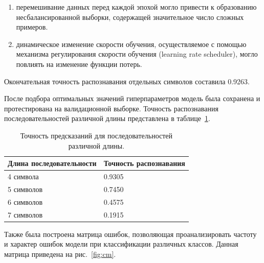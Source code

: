 \begin{enumerate}
    \item перемешивание данных перед каждой эпохой могло привести к образованию 
    несбалансированной выборки, содержащей значительное число сложных примеров.
    \item динамическое изменение скорости обучения, осуществляемое с помощью 
    механизма регулирования скорости обучения (learning rate scheduler), могло 
    повлиять на изменение функции потерь.
\end{enumerate}

Окончательная точность распознавания отдельных символов составила 0.9263.

После подбора оптимальных значений гиперпараметров модель была сохранена и 
протестирована на валидационной выборке. Точность распознавания 
последовательностей различной длины представлена в таблице~\ref{tab:probability}.

\begin{table}[H]
    \centering
    \caption{Точность предсказаний для последовательностей различной длины.}
    \begin{tabular}{|l|l|}
        \hline
        Длина последовательности & Точность распознавания \\
        \hline
        4 символа & 0.9305 \\
        \hline
        5 символов & 0.7450 \\
        \hline
        6 символов & 0.4575 \\
        \hline
        7 символов & 0.1915 \\
        \hline
    \end{tabular}
    \label{tab:probability}
\end{table}

Также была построена матрица ошибок, позволяющая проанализировать частоту и 
характер ошибок модели при классификации различных классов. Данная матрица 
приведена на рис.~\ref{fig:cm}.

